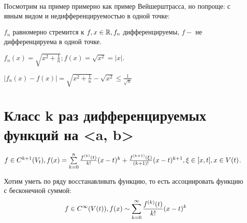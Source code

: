 \documentclass[12pt]{report}
\begin{document}
\begin{ex}
Посмотрим на пример примерно как пример Вейшерштрасса, но попроще: с явным видом и недифференцируемостью в одной точке:

$f_n$ равномерно стремится к $f, x \in \mathbb{R}, f_n$ дифференцируемы, $f - $ не дифференцируема в одной точке.

$f_n(x) = \sqrt{x^2 + \frac{1}{n}}; f(x) = \sqrt{x^2} = |x|$.

$|f_n(x) - f(x)| = \sqrt{x^2 + \frac{1}{n}} - \sqrt{x^2} \le \frac{1}{\sqrt{n}}$
\end{ex}


\section{Класс k раз дифференцируемых функций на <a, b>}

$f \in C^{k + 1}(V_t), f(x) = \sum\limits_{k = 0}^n{\frac{f^{(k)}(t)}{k!}(x - t)^k} + \frac{f^{(k + 1)}(\xi)}{(k + 1)!}(x - t)^{k + 1}, \xi \in [x, t], x \in V(t)$.

Хотим уметь по ряду восстанавливать функцию, то есть ассоциировать функцию с бесконечной суммой:
$$f \in C^\infty(V(t)), f(x) \sim \sum\limits_{k = 0}^\infty{\frac{f^{(k)}(t)}{k!}(x - t)^k}$$
\end{document}
